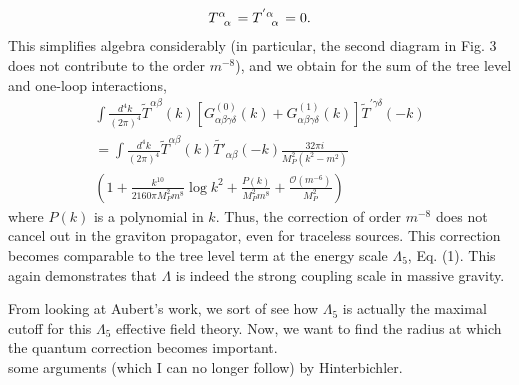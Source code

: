 \documentclass{book}
\theoremstyle{definition}
\newcommand{\nn}{\nonumber}
\newcommand{\al}{\alpha}
\newcommand{\be}{\beta}
\newcommand{\f}[2]{\frac{#1}{#2}}
\newcommand{\lp}{\left(}
\newcommand{\rp}{\right)}
\newcommand{\lb}{\left[}
\newcommand{\rb}{\right]}
\begin{document}
\begin{framed}
	\begin{align}
	\tensor{T}{^\al_\al} = \tensor{T}{^{'\al}_\al} = 0.
	\end{align}
	This simplifies algebra considerably (in particular, the second diagram in
	Fig. 3 does not contribute to the order $m^{-8}$), and we obtain for the sum of the tree level and one-loop interactions,
	\begin{align} 
	\int \f{d^4k}{(2\pi)^4} \tilde{T}^{\al\be}(k)\lb G^{(0)}_{\al\be\gamma\delta}(k) + G^{(1)}_{\al\be\gamma\delta}(k) \rb \tilde{T}^{'\gamma\delta}(-k)\nn\\
	= \int \f{d^4k}{(2\pi)^4} \tilde{T}^{\al\be}(k)\tilde{T'}_{\al\be}(-k)\f{32\pi i}{M_P^2 (k^2 - m^2)}\nn\\
	\lp 1 + \f{k^{10}}{2160 \pi M_P^2 m^8}\log{k^2} + \f{P(k)}{M_P^2 m^8} + \f{\mathcal{O}(m^{-6})}{M_P^2} \rp
	\end{align}
	where $P(k)$ is a polynomial in $k$. Thus, the correction of order $m^{-8}$ does not cancel out in the graviton propagator, even for traceless sources. This correction becomes comparable
	to the tree level term at the energy scale $\Lambda_5$, Eq. (1). This again demonstrates
	that $\Lambda$ is indeed the strong coupling scale in massive gravity.
	
	
  	
	
\end{framed}




From looking at Aubert's work, we sort of see how $\Lambda_5$ is actually the maximal cutoff for this $\Lambda_5$ effective field theory. Now, we want to find the radius at which the quantum correction becomes important. \\


some arguments (which I can no longer follow) by Hinterbichler.\\
\end{document}
